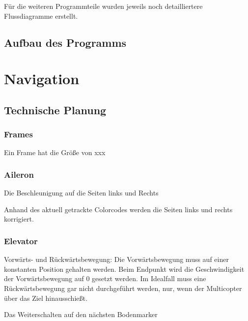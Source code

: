   Für die weiteren Programmteile wurden jeweils noch detailliertere Flussdiagramme erstellt.

  \subsection{Aufbau des Programms}






\section{Navigation}

  \subsection{Technische Planung}

    \subsubsection{Frames}


    Ein Frame hat die Größe von xxx

    \subsubsection{Aileron}

    Die Beschleunigung auf die Seiten links und Rechts

    Anhand des aktuell getrackte Colorcodes werden die Seiten links und rechts korrigiert.



    \subsubsection{Elevator}

    Vorwärts- und Rückwärtsbewegung: Die Vorwärtsbewegung muss auf einer konstanten Position gehalten werden. Beim Endpunkt wird die Geschwindigkeit der Vorwärtsbewegung auf 0 gesetzt werden. Im Idealfall muss eine Rückwärtsbewegung gar nicht durchgeführt werden, nur, wenn der Multicopter über das Ziel hinausschießt.

    Das Weiterschalten auf den nächsten Bodenmarker

